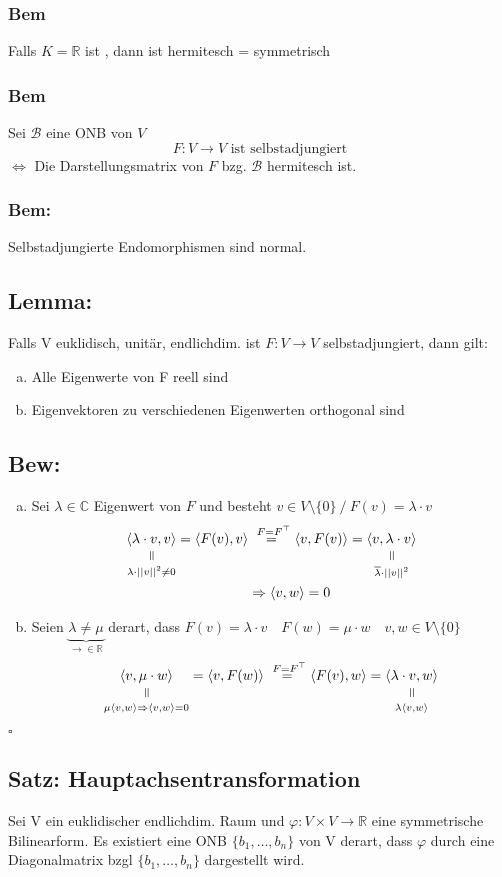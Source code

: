 \documentclass[titlepage,12pt,a4paper,ngerman]{report}
\newenvironment{bew}[1]{\subsection{Bew: #1}}{\hfill$\square$}
\newcommand{\Bew}[2]{\begin{bew}{#1}#2\end{bew}}
\newcommand{\verteq}{\rotatebox{90}{$\,=$}}
\newcommand{\equalto}[2]{\underset{\scriptstyle\overset{\mkern4mu\verteq}{#2}}{#1}}
\newcommand{\tx}[1]{\textrm{#1}}
\newcommand{\basis}[3]{\{#1_{#2}, \dots, #1_{#3}\}}
\newcommand{\ska}[2]{\langle #1 , #2 \rangle}
\begin{document}
\subsubsection{Bem}
Falls $K = \mathbb R$ ist , dann ist hermitesch = symmetrisch
\subsubsection{Bem}
Sei $\mathcal B$ eine ONB von $V$
$$F: V \to V \tx{ ist selbstadjungiert}$$
$\Leftrightarrow$ Die Darstellungsmatrix von $F$ bzg. $\mathcal B$ hermitesch ist.
\subsubsection{Bem:}
Selbstadjungierte Endomorphismen sind normal.
\subsection{Lemma:}
Falls V euklidisch, unitär, endlichdim. ist $ F: V\to V $ selbstadjungiert, dann gilt:
\begin{enumerate}[a)]
	\item Alle Eigenwerte von F reell sind
	\item Eigenvektoren zu verschiedenen Eigenwerten orthogonal sind
\end{enumerate}

\Bew{}{
\begin{enumerate}[a)]
	\item Sei $\lambda \in \mathbb C$ Eigenwert von $F$ und besteht $v \in V \setminus \{0\}\ / \ F(v) = \lambda \cdot v$
	\begin{align*}
 		\equalto{\ska{\lambda \cdot v}{v}}{\lambda \cdot ||v||^2 \neq 0} = \ska{F(v)}{v}& \buildrel{\ F = F^\top} \over = \ska{v}{F(v)} = \equalto{\ska{v}{\lambda \cdot v}}{\overline{\lambda} \cdot ||v||^2}\\
 		&\Rightarrow \ska{v}{w} = 0
	\end{align*}
	\item Seien $\underbrace{\lambda \neq \mu}_{\rightarrow \in \mathbb R}$ derart, dass $F(v) = \lambda \cdot v \quad F(w) = \mu \cdot w \quad v,w \in V \setminus \{0\}$
	$$\equalto{\ska{v}{\mu \cdot w}}{\mu \ska{v}{w} \Rightarrow \ska{v}{w} = 0} = \ska{v}{F(w)} \buildrel{\ F = F^\top} \over = \ska{F(v)}{w}= \equalto{\ska{\lambda \cdot v}{w}}{\lambda \ska{v}{w}}$$
\end{enumerate}}

\subsection{Satz: Hauptachsentransformation}
Sei V ein euklidischer endlichdim. Raum und $ \varphi: V \times V \to \mathbb{R} $ eine symmetrische Bilinearform. Es existiert eine ONB  $ \basis{b}{1}{n} $ von V derart, dass $ \varphi $ durch eine Diagonalmatrix bzgl $ \basis{b}{1}{n} $ dargestellt wird.
\end{document}
